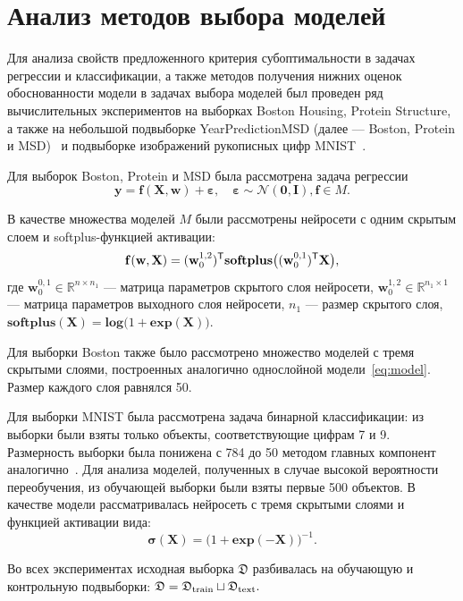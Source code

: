 \section{Анализ методов выбора моделей}
Для анализа свойств предложенного критерия субоптимальности в задачах регрессии и классификации, а также методов получения нижних оценок обоснованности модели в задачах выбора моделей был проведен ряд вычислительных экспериментов на выборках Boston Housing, Protein Structure, а также на небольшой подвыборке YearPredictionMSD (далее --- Boston, Protein и MSD)~\cite{UCI} {и подвыборке изображений рукописных цифр MNIST~\cite{mnist}}.

{Для выборок Boston, Protein и MSD} была рассмотрена задача регрессии
\[
	\mathbf{y} = \mathbf{f}(\mathbf{X}, \mathbf{w}) + \boldsymbol{\varepsilon}, \quad  \boldsymbol{\varepsilon} \sim \mathcal{N}(\mathbf{0}, \mathbf{I}), \mathbf{f} \in {M}.
\]

В качестве множества моделей $M$ были рассмотрены  нейросети с одним скрытым слоем и softplus-функцией активации:
\begin{equation}
\label{eq:model}
	\mathbf{f}(\mathbf{w}, \mathbf{X}) =   (\mathbf{w}_0^{1,2})^{\mathsf{T}}  \textbf{softplus}\bigl((\mathbf{w}_0^{0,1})^{\mathsf{T}} \mathbf{X}  \bigr)  ,
\end{equation}
где $\mathbf{w}_0^{0,1}  \in \mathbb{R}^{n\times n_1}$ --- матрица параметров скрытого слоя нейросети, $\mathbf{w}_0^{1,2} \in \mathbb{R}^{n_1\times 1}$ --- матрица параметров выходного слоя нейросети, $n_1$ --- размер скрытого слоя,  {$\textbf{softplus}(\mathbf{X}) = \textbf{log}\bigl(1+\textbf{exp}(\mathbf{X})\bigr)$}.

{Для выборки Boston также было рассмотрено множество моделей с тремя скрытыми слоями, построенных аналогично однослойной модели~\eqref{eq:model}. Размер каждого слоя равнялся 50.}

{Для выборки MNIST была рассмотрена задача бинарной классификации: из выборки были взяты только объекты, соответствующие цифрам 7 и 9. Размерность выборки была понижена с 784 до 50 методом главных компонент аналогично~\cite{firefly}. Для анализа моделей, полученных в случае высокой вероятности переобучения, из обучающей выборки были взяты первые 500 объектов. В качестве модели рассматривалась нейросеть с тремя скрытыми слоями и функцией активации вида:}
$$\boldsymbol{\sigma}(\mathbf{X}) = \bigl(1+\textbf{exp}(\mathbf{-X})\bigr)^{-1}.$$



Во всех экспериментах исходная выборка $\mathfrak{D}$ разбивалась на обучающую и контрольную подвыборки:
$
	\mathfrak{D} = \mathfrak{D}_\textnormal{train} \sqcup \mathfrak{D}_\textnormal{text}.
$

